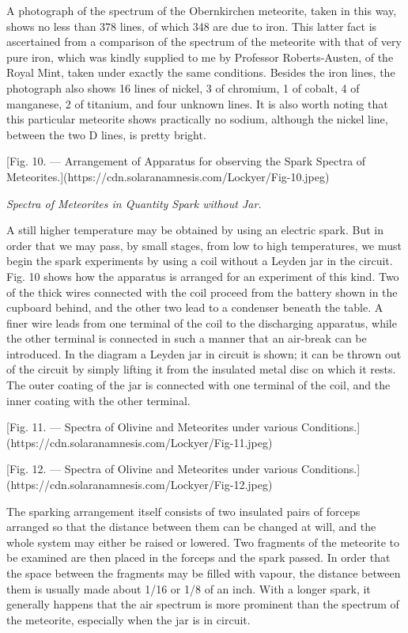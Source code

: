 \documentclass[a4paper, 12pt, oneside, polutonikogreek, english]{article}
\begin{document}
A photograph of the spectrum of the Obernkirchen meteorite, taken in this way, shows no less than 378 lines, of which 348 are due to iron. This latter fact is ascertained from a comparison of the spectrum of the meteorite with that of very pure iron, which was kindly supplied to me by Professor Roberts-Austen, of the Royal Mint, taken under exactly the same conditions. Besides the iron lines, the photograph also shows 16 lines of nickel, 3 of chromium, 1 of cobalt, 4 of manganese, 2 of titanium, and four unknown lines. It is also worth noting that this particular meteorite shows practically no sodium, although the nickel line, between the two D lines, is pretty bright.

[Fig. 10. --- Arrangement of Apparatus for observing the Spark Spectra of Meteorites.](https://cdn.solaranamnesis.com/Lockyer/Fig-10.jpeg)

\emph{Spectra of Meteorites in Quantity Spark without Jar.}

A still higher temperature may be obtained by using an electric spark. But in order that we may pass, by small stages, from low to high temperatures, we must begin the spark experiments by using a coil without a Leyden jar in the circuit. Fig. 10 shows how the apparatus is arranged for an experiment of this kind. Two of the thick wires connected with the coil proceed from the battery shown in the cupboard behind, and the other two lead to a condenser beneath the table. A finer wire leads from one terminal of the coil to the discharging apparatus, while the other terminal is connected in such a manner that an air-break can be introduced. In the diagram a Leyden jar in circuit is shown; it can be thrown out of the circuit by simply lifting it from the insulated metal disc on which it rests. The outer coating of the jar is connected with one terminal of the coil, and the inner coating with the other terminal.

[Fig. 11. --- Spectra of Olivine and Meteorites under various Conditions.](https://cdn.solaranamnesis.com/Lockyer/Fig-11.jpeg)

[Fig. 12. --- Spectra of Olivine and Meteorites under various Conditions.](https://cdn.solaranamnesis.com/Lockyer/Fig-12.jpeg)

The sparking arrangement itself consists of two insulated pairs of forceps arranged so that the distance between them can be changed at will, and the whole system may either be raised or lowered. Two fragments of the meteorite to be examined are then placed in the forceps and the spark passed. In order that the space between the fragments may be filled with vapour, the distance between them is usually made about 1/16 or 1/8 of an inch. With a longer spark, it generally happens that the air spectrum is more prominent than the spectrum of the meteorite, especially when the jar is in circuit.
\end{document}
